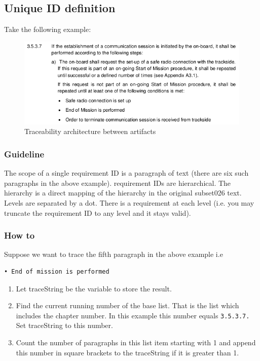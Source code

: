 \documentclass[11pt]{template/openetcs_report}
\begin{document}
\subsection{Unique ID definition}
\label{sec-2-2}
Take the following example:
\begin{figure}[htb]
\centering
\includegraphics[width=.9\linewidth]{images/tracestring-ex.png}
\caption{\label{fig:reqID_ex}Traceability architecture between artifacts}
\end{figure}


\subsubsection{Guideline}
\label{sec-2-2-1}
The scope of a single requirement ID is a paragraph of text (there are six such
paragraphs in the above example).  requirement IDs are hierarchical. The
hierarchy is a direct mapping of the hierarchy in the original subset026
text. Levels are separated by a dot. There is a requirement at each level
(i.e. you may truncate the requirement ID to any level and it stays valid).

\subsubsection{How to}
\label{sec-2-2-2}

Suppose we want to trace the fifth paragraph in the above example i.e
\begin{verbatim}
• End of mission is performed
\end{verbatim}
\begin{enumerate}
\item Let traceString be the variable to store the result.
\item Find the current running number of the base list. That is the list which
includes the chapter number. In this example this number equals
\verb+3.5.3.7.+ Set traceString to this number.
\item Count the number of paragraphs in this list item starting with 1 and append
this number in square brackets to the traceString if it is greater than 1.
\end{enumerate}
\end{document}
